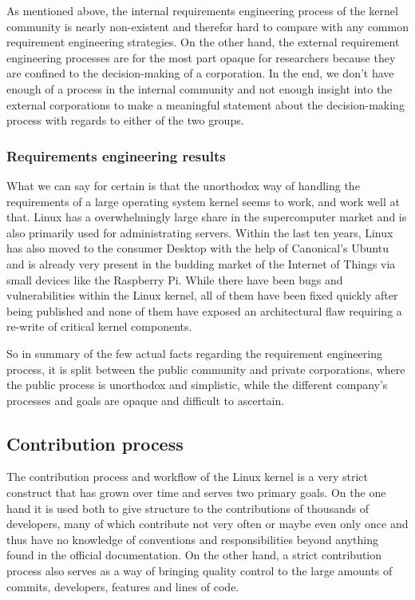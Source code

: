 \documentclass{sig-alternate-05-2015}
\begin{document}
As mentioned above, the internal requirements engineering process of the kernel community is nearly non-existent and therefor hard to compare with any common requirement engineering strategies.
On the other hand, the external requirement engineering processes are for the most part opaque for researchers because they are confined to the decision-making of a corporation.
In the end, we don't have enough of a process in the internal community and not enough insight into the external corporations to make a meaningful statement about the decision-making process with regards to either of the two groups.

\subsubsection{Requirements engineering results}

What we can say for certain is that the unorthodox way of handling the requirements of a large operating system kernel seems to work, and work well at that.
Linux has a overwhelmingly large share in the supercomputer market and is also primarily used for administrating servers.
Within the last ten years, Linux has also moved to the consumer Desktop with the help of Canonical's Ubuntu and is already very present in the budding market of the Internet of Things via small devices like the Raspberry Pi.
While there have been bugs and vulnerabilities within the Linux kernel, all of them have been fixed quickly after being published and none of them have exposed an architectural flaw requiring a re-write of critical kernel components.

So in summary of the few actual facts regarding the requirement engineering process, it is split between the public community and private corporations, where the public process is unorthodox and simplistic, while the different company's processes and goals are opaque and difficult to ascertain.

\subsection{Contribution process}

The contribution process and workflow of the Linux kernel is a very strict construct that has grown over time and serves two primary goals.
On the one hand it is used both to give structure to the contributions of thousands of developers, many of which contribute not very often or maybe even only once and thus have no knowledge of conventions and responsibilities beyond anything found in the official documentation.
On the other hand, a strict contribution process also serves as a way of bringing quality control to the large amounts of commits, developers, features and lines of code.
\end{document}
